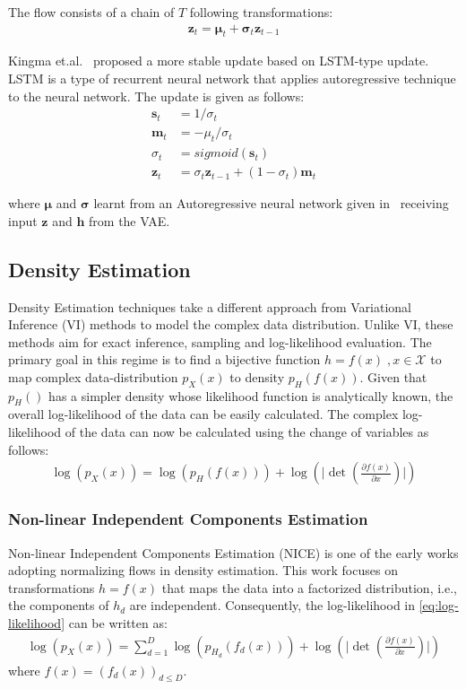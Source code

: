 \documentclass[runningheads]{llncs}
\begin{document}
The flow consists of a chain of $T$ following transformations:
\begin{align}
\mathbf{z}_t = \bm{\mu}_t + \bm{\sigma}_t\mathbf{z}_{t-1}
\end{align}

Kingma et.al.~\cite{kingma2016improved} proposed a more stable update based on LSTM-type update. LSTM is a type of recurrent neural network that applies autoregressive technique to the neural network.  The update is given as follows:
\begin{align}
\mathbf{s}_t &= 1 / \sigma_t\\
\mathbf{m}_t &= -\mu_t / \sigma_t\\
\sigma_t &= sigmoid(\mathbf{s}_t)\\
\mathbf{z}_t &= \sigma_t\mathbf{z}_{t-1} + (1 - \sigma_t)\mathbf{m}_{t} 
\end{align}

where $\bm{\mu}$ and $\bm{\sigma}$ learnt from an Autoregressive neural network given in~\cite{germain2015made} receiving input $\mathbf{z}$ and $\mathbf{h}$ from the VAE. 

\subsection{Density Estimation}
Density Estimation techniques take a different approach from Variational Inference (VI) methods to model the complex data distribution. Unlike VI, these methods aim for exact inference, sampling and log-likelihood evaluation. The primary goal in this regime is to find a bijective function $h=f(x)\;,x \in \mathcal{X}$ to map complex data-distribution $p_X(x)$ to density $p_H(f(x))$. Given that $p_H()$ has a simpler density whose likelihood function is analytically known, the overall log-likelihood of the data can be easily calculated. The complex log-likelihood of the data can now be calculated using the change of variables as follows:
\begin{align}
\log(p_X(x)) = \log(p_H(f(x))) +
\log(\lvert \det(\frac{\partial f(x)}{\partial x}) \rvert) \label{eq:log-likelihood}
\end{align}

\subsubsection{Non-linear Independent Components Estimation} \label{sec:nice}

Non-linear Independent Components Estimation (NICE) \cite{dinh2014nice} is one of the early works adopting normalizing flows in density estimation. This work focuses on transformations $h=f(x)$ that maps the data into a factorized distribution, i.e., the components of $h_d$ are independent. Consequently, the log-likelihood in \cref{eq:log-likelihood} can be written as:
\begin{align}
\log(p_X(x)) = \sum_{d=1}^{D}{\log(p_{H_{d}}(f_{d}(x)))} + \log(\lvert \det(\frac{\partial f(x)}{\partial x}) \rvert)
\end{align}
where $f(x) = (f_{d}(x))_{d \leq D}$.
\end{document}

